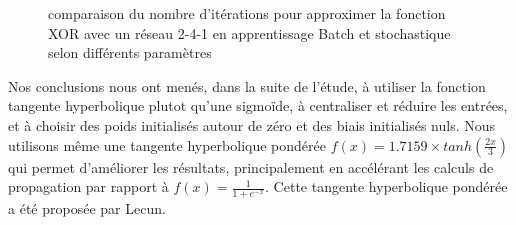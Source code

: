 \documentclass[
    10pt,
    a4paper,
    oneside,
    headinclude,footinclude,
    BCOR=5mm,
    captions=tableabove
]{scrartcl}
\begin{document}
\begin{figure}[H]
\centering
{}
\hspace{1mm}
\vspace{2mm}
\hspace{1mm}

\caption{comparaison du nombre d'itérations pour approximer la fonction XOR avec un réseau 2-4-1 en apprentissage Batch et stochastique selon différents paramètres}
\end{figure}

Nos conclusions nous ont menés, dans la suite de l'étude, à utiliser la fonction tangente hyperbolique plutot qu'une sigmoïde, à centraliser et réduire les entrées, et à choisir des poids initialisés autour de zéro et des biais initialisés nuls.
Nous utilisons même une tangente hyperbolique pondérée $f(x) = 1.7159 \times tanh(\frac{2x}{3})$ qui permet d'améliorer les résultats, principalement en accélérant les calculs de propagation par rapport à $f(x) = \frac{1}{1 + e^{-x}}$. Cette tangente hyperbolique pondérée a été proposée par Lecun. %
\end{document}
